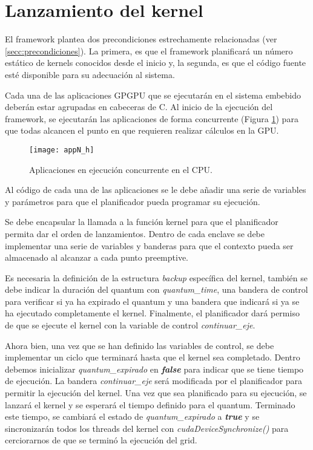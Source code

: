   

\section{Lanzamiento del kernel}\label{secc:lanzamientoKernel}

El framework plantea dos precondiciones estrechamente relacionadas (ver \ref{secc:precondiciones}). La primera, es que el framework planificará un número estático de kernels conocidos desde el inicio y, la segunda, es que el código fuente esté disponible para su adecuación al sistema.
\newline

Cada una de las aplicaciones GPGPU que se ejecutarán en el sistema embebido deberán estar agrupadas en cabeceras de C. Al inicio de la ejecución del framework, se ejecutarán las aplicaciones de forma concurrente (Figura \ref{fig:appN_h}) para que todas alcancen el punto en que requieren realizar cálculos en la GPU.

  \begin{figure}[!]
      \centering
        \texttt{[image: appN\_h]}
        \caption{Aplicaciones en ejecución concurrente en el CPU.}
        \label{fig:appN_h}
    \end{figure}

Al código de cada una de las aplicaciones se le debe añadir una serie de variables y parámetros para que el planificador pueda programar su ejecución. 
\newline

Se debe encapsular la llamada a la función kernel para que el planificador permita dar el orden de lanzamientos. Dentro de cada enclave se debe implementar una serie de variables y banderas para que el contexto pueda ser almacenado al alcanzar a cada punto preemptive. 
\newline

Es necesaria la definición de la estructura \textit{backup} específica del kernel, también se debe indicar la duración del quantum con \textit{quantum\_time}, una bandera de control para verificar si ya ha expirado el quantum y una bandera que indicará si ya se ha ejecutado completamente el kernel. Finalmente, el planificador dará permiso de que se ejecute el kernel con la variable de control \textit{continuar\_eje}.
\newline

Ahora bien, una vez que se han definido las variables de control, se debe implementar un ciclo que terminará hasta que el kernel sea completado. Dentro debemos inicializar \textit{quantum\_expirado} en \textbf{\textit{false}} para indicar que se tiene tiempo de ejecución. La bandera \textit{continuar\_eje} será modificada por el planificador para permitir la ejecución del kernel. Una vez que sea planificado para su ejecución, se lanzará el kernel  y se esperará el tiempo definido para el quantum. Terminado este tiempo, se cambiará el estado de \textit{quantum\_expirado} a \textit{\textbf{true}} y se sincronizarán todos los threads del kernel con \textit{cudaDeviceSynchronize()} para cerciorarnos de que se terminó la ejecución del grid.

